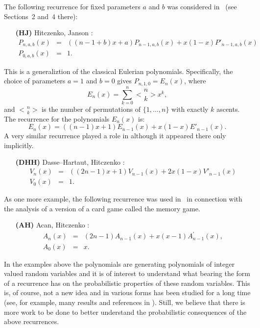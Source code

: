 \documentclass[10pt]{amsart}
\numberwithin{subcase}{case}
\begin{document}
The following recurrence for fixed parameters $a$ and $b$ was considered in~\cite{HJ} (see Sections~2 and~4 there):
\begin{itemize}
\item[{\bf(HJ)}]{}   Hitczenko, Janson \cite{HJ}: 
\begin{eqnarray*}P_{n,a,b}(x)&=&((n-1+b)x+a)P_{n-1,a,b}(x)+x(1-x)P'_{n-1,a,b}(x)\\ P_{0,a,b}(x)&=&1.\end{eqnarray*} 
\end{itemize}
This is a generaliztion of the classical Eulerian polynomials.  Specifically,  the choice of parameters $a=1$ and $b=0$ gives $P_{n,1,0}=E_n(x)$, where
\[E_n(x)=\sum_{k=0}^n{\genfrac{ < }{ > }{0pt}{}{n}{k}}x^k,\]
 and ${\genfrac{ < }{ > }{0pt}{}{n}{k}}$ is the number of permutations of $\{1,\dots,n\}$ with exactly $k$ ascents. The  recurrence for the polynomials $E_n(x)$  is:
 \[E_n(x)=((n-1)x+1)E_{n-1}(x)+x(1-x)E'_{n-1}(x).\]
A very similar recurrence played a role in \cite{DHH} although it appeared there only implicitly.
\begin{itemize}
\item[\bf{(DHH)}]{}
Dasse--Hartaut, Hitczenko \cite{DHH}:
\begin{eqnarray*}
V_n(x)&=&((2n-1)x+1)V_{n-1}(x)+2x(1-x)V'_{n-1}(x) \\ V_0(x)&=& 1.
\end{eqnarray*}
\end{itemize}
As one more example, the following recurrence was used in~\cite[Section~3]{AH} in connection with the analysis of a version of a card game called the memory game. 
\begin{itemize}
\item[\bf{(AH)}]{}
Acan, Hitczenko \cite{AH}:
\begin{eqnarray*}
A_n(x)&=&(2n-1)A_{n-1}(x)+x(x-1)A_{n-1}^{'}(x),\\ A_0(x)&=&x.
\end{eqnarray*}

\end{itemize}
In the examples above the polynomials are generating polynomials of integer valued random variables and it is of interest to understand what bearing the form of a recurrence has on the probabilistic properties of these  random variables. This is, of course, not a new idea and in various forms has been studied for a long time (see, for example, many results and references in \cite{FS}). Still, we believe that there is more work to be done to better understand the probabilistic consequences of the above recurrences. 
\end{document}
